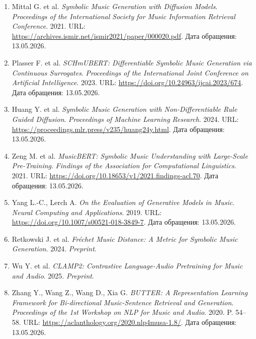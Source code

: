 \documentclass[a4paper,12pt]{extarticle}
\begin{document}
\begin{enumerate}
\item \label{ref:mittal2021-diffusion} Mittal G. et al. \textit{Symbolic Music Generation with Diffusion Models}. \textit{Proceedings of the International Society for Music Information Retrieval Conference}. 2021. URL: \url{https://archives.ismir.net/ismir2021/paper/000020.pdf}. Дата обращения: 13.05.2026.

\item \label{ref:plasser2023-schmubert} Plasser F. et al. \textit{SCHmUBERT: Differentiable Symbolic Music Generation via Continuous Surrogates}. \textit{Proceedings of the International Joint Conference on Artificial Intelligence}. 2023. URL: \url{https://doi.org/10.24963/ijcai.2023/674}. Дата обращения: 13.05.2026.

\item \label{ref:huang2024-ruleguided} Huang Y. et al. \textit{Symbolic Music Generation with Non-Differentiable Rule Guided Diffusion}. \textit{Proceedings of Machine Learning Research}. 2024. URL: \url{https://proceedings.mlr.press/v235/huang24y.html}. Дата обращения: 13.05.2026.

\item \label{ref:zeng2021-musicbert} Zeng M. et al. \textit{MusicBERT: Symbolic Music Understanding with Large-Scale Pre-Training}. \textit{Findings of the Association for Computational Linguistics}. 2021. URL: \url{https://doi.org/10.18653/v1/2021.findings-acl.70}. Дата обращения: 13.05.2026.

\item \label{ref:yang-lerch2019-eval} Yang L.-C., Lerch A. \textit{On the Evaluation of Generative Models in Music}. \textit{Neural Computing and Applications}. 2019. URL: \url{https://doi.org/10.1007/s00521-018-3849-7}. Дата обращения: 13.05.2026.

\item \label{ref:retkowski2024-fmd} Retkowski J. et al. \textit{Fréchet Music Distance: A Metric for Symbolic Music Generation}. 2024. \textit{Preprint}.

\item \label{ref:wu2025-clamp2} Wu Y. et al. \textit{CLAMP2: Contrastive Language-Audio Pretraining for Music and Audio}. 2025. \textit{Preprint}.

\item \label{ref:zhang2020-butter} Zhang Y., Wang Z., Wang D., Xia G. \textit{BUTTER: A Representation Learning Framework for Bi-directional Music-Sentence Retrieval and Generation}. \textit{Proceedings of the 1st Workshop on NLP for Music and Audio}. 2020. P. 54--58. URL: \url{https://aclanthology.org/2020.nlp4musa-1.8/}. Дата обращения: 13.05.2026.


\end{enumerate}
\end{document}
